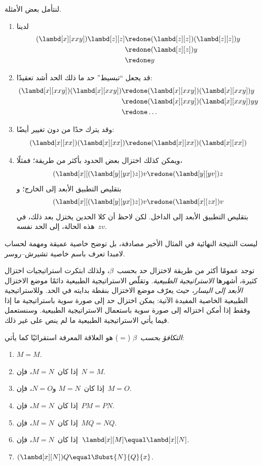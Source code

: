 \documentclass[../../../include/open-logic-section]{subfiles}
\begin{document}
لنتأمل بعض الأمثلة.
\begin{enumerate}
\item لدينا
\begin{align*}
(\lambd[x][xxy]) \lambd[z][z] & \redone (\lambd[z][z])(\lambd[z][z]) y \\
& \redone (\lambd[z][z]) y \\
& \redone y
\end{align*}
\item قد يجعل ``تبسيط'' حد ما ذلك الحد أشد تعقيدًا:
\begin{align*}
(\lambd[x][xxy])(\lambd[x][xxy]) & \redone (\lambd[x][xxy])(\lambd[x][xxy])y \\
& \redone (\lambd[x][xxy])(\lambd[x][xxy])yy \\
& \redone \dots
\end{align*}
\item وقد يترك حدًا من دون تغيير أيضًا:
\[
(\lambd[x][xx])(\lambd[x][xx]) \redone (\lambd[x][xx])(\lambd[x][xx])
\]
\item ويمكن كذلك اختزال بعض الحدود بأكثر من طريقة؛ فمثلًا،
\[
(\lambd[x][(\lambd[y][yx]) z]) v \redone (\lambd[y][yv]) z
\]
بتقليص التطبيق الأبعد إلى الخارج؛ و
\[
(\lambd[x][(\lambd[y][yx]) z]) v \redone (\lambd[x][zx]) v
\]
بتقليص التطبيق الأبعد إلى الداخل. لكن لاحظ أن كلا الحدين يختزل بعد ذلك،
في هذه الحالة، إلى الحد نفسه~$zv$.
\end{enumerate}

ليست النتيجة النهائية في المثال الأخير مصادفة، بل توضح خاصية عميقة
ومهمة لحساب لامبدا تعرف باسم خاصية تشيرش--روسر.

\begin{digress}
  توجد عمومًا أكثر من طريقة لاختزال حد بحسب~$\beta$، ولذلك ابتكرت
  استراتيجيات اختزال كثيرة، أشهرها \emph{الاستراتيجية الطبيعية}. وتقلّص
  الاستراتيجية الطبيعية دائمًا موضع الاختزال \emph{الأبعد إلى اليسار}،
  حيث يعرّف موضع الاختزال بنقطة بدايته في الحد. وللاستراتيجية الطبيعية
  الخاصية المفيدة الآتية: يمكن اختزال حد إلى صورة سوية باستراتيجية ما إذا
  وفقط إذا أمكن اختزاله إلى صورة سوية باستعمال الاستراتيجية الطبيعية.
  وسنستعمل فيما يأتي الاستراتيجية الطبيعية ما لم ينص على غير ذلك.
\end{digress}

\begin{defn}
  \emph{التكافؤ بحسب~$\beta$} ($\equal$) هو العلاقة المعرفة استقرائيًا
  كما يأتي:
  \begin{enumerate}
  \item $M \equal M$.
  \item إذا كان~$M \equal N$، فإن~$N \equal M$.
  \item إذا كان~$M \equal N$ و$N \equal O$، فإن~$M \equal O$.
  \item إذا كان~$M \equal N$، فإن~$PM \equal PN$.
  \item إذا كان~$M \equal N$، فإن~$MQ \equal NQ$.
  \item إذا كان~$M \equal N$، فإن~$\lambd[x][M] \equal \lambd[x][N]$.
  \item $(\lambd[x][N])Q \equal \Subst{N}{Q}{x}$.
  \end{enumerate}
\end{defn}
\end{document}
